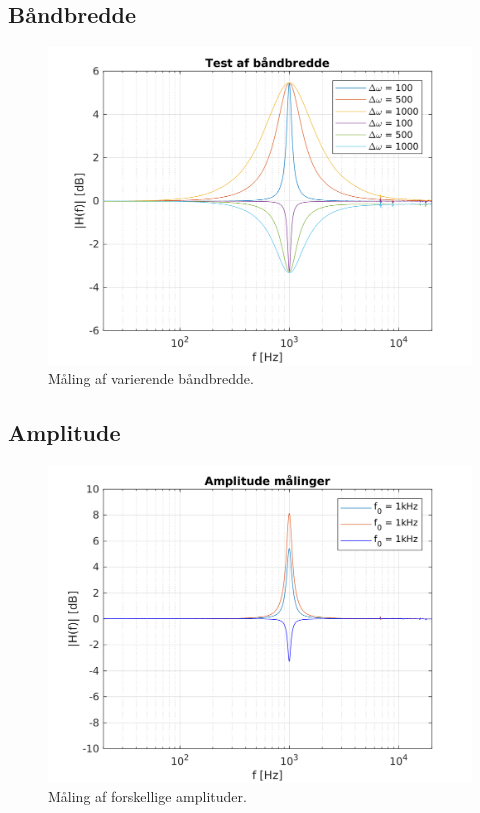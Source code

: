\subsection{Båndbredde}

\begin{figure}[h]
\centering
\includegraphics[scale = 0.8]{matlabdemo/test/test_bw.png}
\caption{Måling af varierende båndbredde.}
\end{figure}




\subsection{Amplitude}

\begin{figure}[h]
\centering
\includegraphics[scale = 0.8]{matlabdemo/test/test_amp.png}
\caption{Måling af forskellige amplituder.}
\end{figure}


%
%















	

